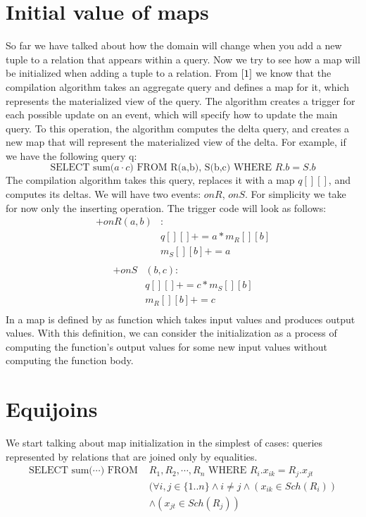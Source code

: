 \documentclass[12pt]{article}
\begin{document}
\section{Initial value of maps}
So far we have talked about how the domain will change when you add a new tuple to a relation that appears within a query. Now we try to see how a map will be initialized when adding a tuple to a relation. From $\cite{1}$ we know that the compilation algorithm takes an aggregate query and defines a map for it, which represents the materialized view of the query. The algorithm creates a trigger for each possible update on an event, which will specify how to update the main query. To this operation, the algorithm computes the delta query, and creates a new map that will represent the materialized view of the delta. For example, if we have the following query q:
\begin{equation}
\mbox{SELECT sum(}a\cdot c\mbox{) FROM R(a,b), S(b,c) WHERE } R.b=S.b
\end{equation}
The compilation algorithm takes this query, replaces it with a map $q[][]$, and computes its deltas. We will have two events: $onR$, $onS$. For simplicity we take for now only the inserting operation. The trigger code will look as follows:
\begin{align*}
+onR(a,b)&:\\
&q[][]+=a*m_R[][b]\\
&m_S[][b]+=a\\
\end{align*}\vspace{-40pt}
\begin{align*}
+onS&(b,c):\\
&q[][]+=c*m_S[][b]\\
&m_R[][b]+=c\\
\end{align*}
In \cite{1} a map is defined by as function which takes input values and produces output values. With this definition, we can consider the initialization as a process of computing the function's output values for some new input values without computing the function body.

\section{Equijoins}

We start talking about map initialization in the simplest of cases: queries represented by relations that are joined only by equalities.
\begin{align}
\mbox{SELECT sum(}\cdots\mbox{) FROM }&R_1,R_2,\cdots,R_n\mbox{ WHERE }R_i.x_{ik}=R_j.x_{jt} \label{query1}\\
&(\forall i,j\in\{1..n\}\land i\not=j\land (x_{ik}\in Sch(R_i))\nonumber\\
&\land(x_{jt}\in Sch(R_j))\nonumber
\end{align}
\end{document}
